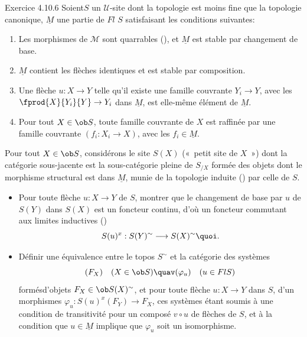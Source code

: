 \documentclass[10pt]{../fichiers-configuration-latex/smfart}
\begin{document}
\begin{enonce*}[remark]{Exercice 4.10.6}
Soient\pageoriginale $S$ un $𝒰$-site dont la topologie est
moins fine que la topologie canonique, $\underline{M}$ une partie de
$Fl$ $S$ satisfaisant les conditions suivantes:
\begin{enumerate}
\renewcommand{\theenumi}{\alph{enumi}}
\renewcommand{\labelenumi}{\theenumi)}
\item Les morphismes de $ℳ$ sont quarrables (), et
$\underline{M}$ est stable par changement de base.

\item $\underline{M}$ contient les flèches identiques et est stable par
composition.

\item Une flèche $u:X\rightarrow Y$ telle qu'il existe une famille
couvrante $Y_i\rightarrow Y$, avec les $\fprod{X}{Y_i}{Y}\rightarrow
Y_i$ dans $\underline{M}$, est elle-même élément de $\underline{M}$.

\item Pour tout $X\in \ob S$, toute famille couvrante de $X$ est
raffinée par une famille couvrante $(f_i:X_i\rightarrow X)$, avec
les $f_i\in \underline{M}$.
\end{enumerate}

Pour tout $X\in \ob S$, considérons le site $S(X)$ (« petit site
de $X$ ») dont la catégorie sous-jacente est la sous-catégorie
pleine de $S_{/X}$ formée des objets dont le morphisme structural
est dans $\underline{M}$, munie de la topologie induite
() par celle de $S$.
\begin{itemize}
\item[$1^{\circ})$] Pour toute flèche $u:X\rightarrow Y$ de $S$,
montrer que le changement de base par $u$ de $S(Y)$ dans $S(X)$ est
un foncteur continu, d'où un foncteur commutant aux limites
inductives ()
$$
S(u)^x:S(Y)^{\sim}\longrightarrow S(X)^{\sim}{\quoi}.
$$

\item[$2^{\circ})$] Définir une équivalence entre le topos
$S^{\sim}$ et la catégorie des systèmes
$$
(F_X)\quad (X\in \ob S)\quav (\varphi_u)\quad (u\in Fl S)
$$
formés\pageoriginale d'objets $F_X\in \ob S(X)^{\sim}$, et pour
toute flèche $u:X\rightarrow Y$ dans $S$, d'un morphismes
$\varphi_u:S(u)^x(F_Y)\rightarrow F_X$, ces systèmes étant
soumis à une condition de transitivité pour un composé $v\circ
u$ de flèches de $S$, et à la condition que $u\in \underline{M}$ implique
que $\varphi_u$ soit un isomorphisme.


\end{itemize}
\end{enonce*}
\end{document}
